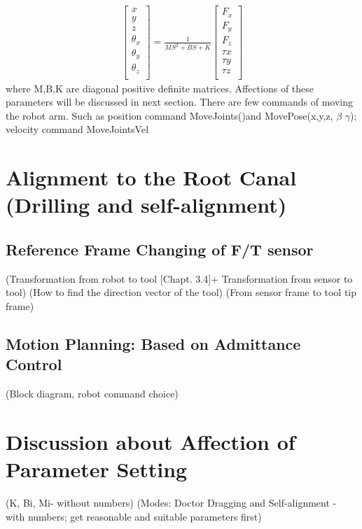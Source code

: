 \begin{equation}
\label{eq:adm}
\begin{split}
\begin{bmatrix}
x \\
y \\
z \\
\theta _x \\
\theta _y \\
\theta _z \\
\end{bmatrix}
=
\frac{1}{MS^2+BS+K}
\begin{bmatrix}
F_x \\
F_y \\
F_z \\
\tau x \\
\tau y \\
\tau z \\
\end{bmatrix}
\end{split}
\end{equation}
where M,B,K are diagonal positive definite matrices. Affections of these parameters will be discussed in next section.
There are few commands of moving the robot arm. Such as position command MoveJoints()and MovePose(x,y,z,\text{$\alpha$} $\beta$ $\gamma$); velocity command MoveJointsVel
\section{Alignment to the Root Canal (Drilling and self-alignment)}
\subsection{Reference Frame Changing of F/T sensor}
\label{sec:rfc}
(Transformation from robot to tool [Chapt. 3.4]+ Transformation from sensor to tool) 
(How to find the direction vector of the tool)
(From sensor frame to tool tip frame)
\subsection{Motion Planning: Based on Admittance Control}
(Block diagram, robot command choice)
\section{Discussion about Affection of Parameter Setting}
\label{sec:affection}
(K, Bi, Mi- without numbers)
(Modes: Doctor Dragging and Self-alignment - with numbers; get reasonable and suitable parameters first)